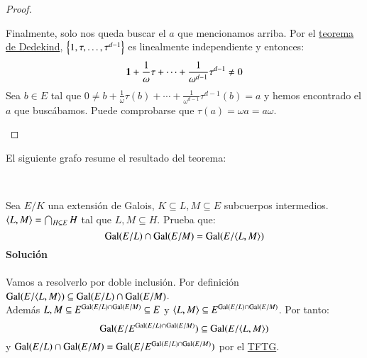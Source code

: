 \begin{proof}
\begin{enumerate}
        Finalmente, solo nos queda buscar el $a$ que mencionamos arriba. Por el \hyperref[thm:4.2]{teorema de Dedekind}, $\left\{1, \tau, \ldots, \tau^{d-1}\right\}$ es linealmente independiente y entonces:
        $$
            \mathbf{1} + \frac{1}{\omega} \tau + \cdots + \frac{1}{\omega^{d-1}}\tau^{d-1} \neq 0
        $$
        Sea $b \in E$ tal que $0 \neq b + \frac{1}{\omega} \tau(b) + \cdots + \frac{1}{\omega^{d-1}}\tau^{d-1}(b) = a$ y hemos encontrado el $a$ que buscábamos. Puede comprobarse que $\tau(a) = \omega a = a \omega$.
    \end{enumerate}
\end{proof}

El siguiente grafo resume el resultado del teorema:\\
\begin{center}
    \\
\end{center}

\begin{ex}[H5.2]
    Sea $E/K$ una extensión de Galois, $K \subseteq L, M \subseteq E$ subcuerpos intermedios. $\langle L, M\rangle = \bigcap_{H \subseteq E} H$ tal que   $L,M \subseteq H$. Prueba que:
    $$
        \mathrm{Gal}(E/L) \cap \mathrm{Gal}(E/M) = \mathrm{Gal}(E/\langle L, M\rangle)
    $$
    \textbf{Solución}\\\\

    Vamos a resolverlo por doble inclusión. Por definición $\mathrm{Gal}(E/\langle L, M\rangle) \subseteq \mathrm{Gal}(E/L) \cap \mathrm{Gal}(E/M)$.\\
    Además $L,M\subseteq E^{\mathrm{Gal}(E/L) \cap \mathrm{Gal}(E/M)} \subseteq E$ y $\langle L, M\rangle \subseteq E^{\mathrm{Gal}(E/L) \cap \mathrm{Gal}(E/M)}$. Por tanto:
    $$
        \mathrm{Gal}(E/E^{\mathrm{Gal}(E/L) \cap \mathrm{Gal}(E/M)}) \subseteq \mathrm{Gal}(E/\langle L, M\rangle)
    $$
    y $\mathrm{Gal}(E/L) \cap \mathrm{Gal}(E/M) = \mathrm{Gal}(E/E^{\mathrm{Gal}(E/L) \cap \mathrm{Gal}(E/M)})$ por el \hyperref[thm:fund-gal]{TFTG}.
\end{ex}

